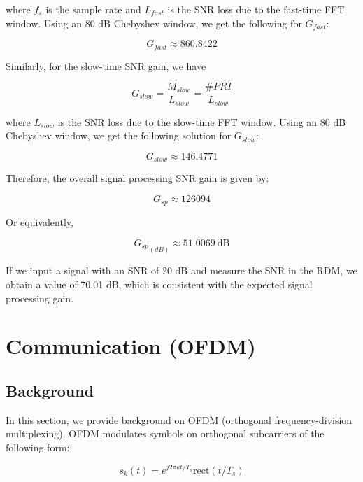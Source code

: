 \documentclass[conference]{IEEEtran}
\begin{document}
	where $f_s$ is the sample rate and $L_{fast}$ is the SNR loss due to the fast-time FFT window. Using an 80 dB Chebyshev window, we get the following for $G_{fast}$:
	
	\begin{equation}
		G_{fast} \approx 860.8422
	\end{equation}
	
	Similarly, for the slow-time SNR gain, we have
	
	\begin{equation}
		G_{slow} = \frac{M_{slow}}{L_{slow}} = \frac{\#PRI}{L_{slow}}
	\end{equation}
		
	where $L_{slow}$ is the SNR loss due to the slow-time FFT window. Using an 80 dB Chebyshev window, we get the following solution for $G_{slow}$:
	
	\begin{equation}
		G_{slow} \approx 146.4771
	\end{equation}
	
	Therefore, the overall signal processing SNR gain is given by:
	
	\begin{equation}
		G_{sp} \approx 126094
	\end{equation}
	
	Or equivalently,
	
	\begin{equation}
		 {G_{sp}}_{(dB)} \approx 51.0069\ \text{dB}
	\end{equation}
	
	If we input a signal with an SNR of 20 dB and measure the SNR in the RDM, we obtain a value of 70.01 dB, which is consistent with the expected signal processing gain.
		
     \section {Communication (OFDM)}
     
	 \subsection {Background}
	 
	 	In this section, we provide background on OFDM (orthogonal frequency-division multiplexing). OFDM modulates symbols on orthogonal subcarriers of the following form:
	 	
	 	\begin{equation}
	 		s_k(t) = e^{j2{\pi}kt/T_s}\text{rect}(t/T_s)
	 	\end{equation}
	 	
\end{document}
